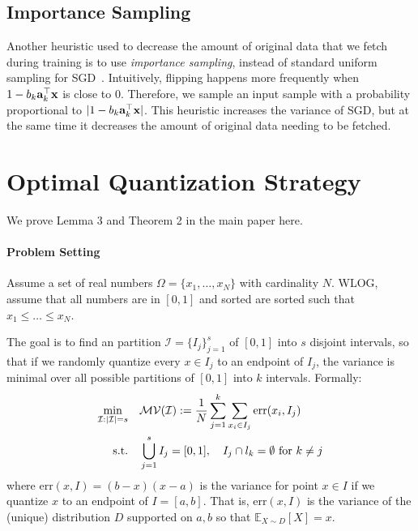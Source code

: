 \documentclass{article}
\def\a{{\bf a}}
\def\x{{\bf x}}
\def\E{\mathbb{E}}
\newcommand{\err}{\ensuremath{\mathrm{err}}}
\newcommand{\setI}{\mathcal{I}}
\newcommand{\todo}[1]{\noindent \textbf{[TODO:] #1 } }
\begin{document}
\subsection{Importance Sampling}  Another heuristic
 used to decrease the amount of original data that
we fetch during training is to use {\em importance
sampling}, instead of standard uniform sampling for SGD~\cite{zhao2015stochastic}. 
Intuitively, flipping happens more frequently
when $1 - b_k \a_k^\top \x$ is close to 0.
Therefore, we sample an input sample
with a probability proportional to 
$|1 - b_k \a_k^\top \x|$. This heuristic 
increases the variance of SGD, 
but at the same time it decreases the amount of original data
needing to be fetched. 



\section{Optimal Quantization Strategy}

We prove Lemma 3 and Theorem 2 in the main paper here.

\vspace{-1em}
\paragraph*{Problem Setting}
Assume a set of real numbers $\Omega = \{x_1, \ldots, x_N\}$ with cardinality $N$. WLOG, assume that all numbers are in $[0, 1]$ and sorted are sorted such that $x_1 \leq \ldots \leq x_N$. 

The goal is to find an partition $\setI = \{I_j\}_{j = 1}^s$ of $[0, 1]$ into $s$ disjoint intervals, so that if we randomly quantize every $x \in I_j$ to an endpoint of $I_j$, the variance is minimal over all possible partitions of $[0, 1]$ into $k$ intervals.
Formally:
\vspace{-0.5em}
\begin{align}
\nonumber \min_{\setI: |\setI| = s} \quad & \mathcal{MV}(\setI) := {1\over N}\sum_{j = 1}^k \sum_{x_i \in I_j} \err(x_i, I_j)\\
\text{s.t.}\quad & \bigcup_{j = 1}^s I_j = [0, 1],\quad I_j\cap l_k = \emptyset~\text{for $k\neq j$}
\label{eq:opt_Q}
\end{align}
where $\err (x, I) = (b - x) (x - a)$ is the variance for point $x \in I$ if we quantize $x$ to an endpoint of $I = [a, b]$.\label{eq:var}
That is, $\err (x, I)$ is the variance of the (unique) distribution $D$ supported on ${a, b}$  so that $\E_{X \sim D} [X] = x$.
\end{document}
